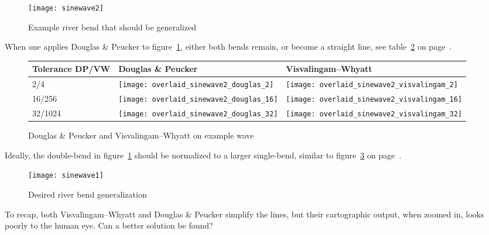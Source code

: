 \documentclass[a4paper]{article}
\newcommand{\DP}{Douglas \& Peucker}
\newcommand{\VW}{Visvalingam--Whyatt}
\begin{document}
\begin{figure}[h]
    \centering
    \texttt{[image: sinewave2]}
    \caption{Example river bend that should be generalized}
    \label{fig:sinewave2}
\end{figure}

When one applies {\DP} to figure~\ref{fig:sinewave2}, either both bends remain,
or become a straight line, see table~\ref{tab:comparison-sinewave2} on
page~\pageref{tab:comparison-sinewave2}.

\begin{figure}[h]
    \renewcommand{\tabularxcolumn}[1]{>{\center\small}m{#1}}
    \begin{tabularx}{\textwidth}{ p{1.5cm} | X | X | }
        Tolerance DP/VW                                                       &
        {\DP}                                                                 &
        {\VW}                                                                 \tabularnewline \hline

        2/4                                                                   &
        \texttt{[image: overlaid\_sinewave2\_douglas\_2]}      &
        \texttt{[image: overlaid\_sinewave2\_visvalingam\_2]}  \tabularnewline \hline

        16/256                                                                &
        \texttt{[image: overlaid\_sinewave2\_douglas\_16]}     &
        \texttt{[image: overlaid\_sinewave2\_visvalingam\_16]} \tabularnewline \hline

        32/1024                                                               &
        \texttt{[image: overlaid\_sinewave2\_douglas\_32]}     &
        \texttt{[image: overlaid\_sinewave2\_visvalingam\_32]} \tabularnewline \hline

    \end{tabularx}
    \caption{{\DP} and {\VW} on example wave}
    \label{tab:comparison-sinewave2}
\end{figure}

Ideally, the double-bend in figure~\ref{fig:sinewave2} should be normalized to
a larger single-bend, similar to figure~\ref{fig:sinewave1} on
page~\pageref{fig:sinewave2}.

\begin{figure}[h]
    \centering
    \texttt{[image: sinewave1]}
    \caption{Desired river bend generalization}
    \label{fig:sinewave1}
\end{figure}

To recap, both {\VW} and {\DP} simplify the lines, but their cartographic
output, when zoomed in, looks poorly to the human eye. Can a better solution be
found?
\end{document}
